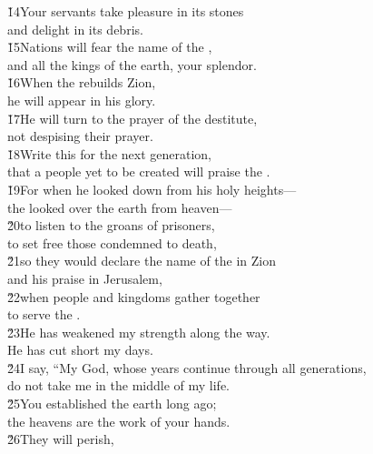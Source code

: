 \begin{poetry}
\poeml \v{14}Your servants take pleasure in its stones \\
\poemll    and delight in its debris. \\
\poeml \v{15}Nations will fear the name of the , \\
\poemll    and all the kings of the earth, your splendor. \\
\poeml \v{16}When the  rebuilds Zion, \\
\poemll    he will appear in his glory. \\
\poeml \v{17}He will turn to the prayer of the destitute, \\
\poemll    not despising their prayer. \\
\poeml \v{18}Write this for the next generation, \\
\poemll    that a people yet to be created will praise the . \\
\poeml \v{19}For when he looked down from his holy heights--- \\
\poemll    the  looked over the earth from heaven--- \\
\poeml \v{20}to listen to the groans of prisoners, \\
\poemll    to set free those condemned to death, \\
\poeml \v{21}so they would declare the name of the  in Zion \\
\poemll    and his praise in Jerusalem, \\
\poeml \v{22}when people and kingdoms gather together \\
\poemll    to serve the . \\
\poeml \v{23}He has weakened my strength along the way. \\
\poemll    He has cut short my days. \\
\poeml \v{24}I say, ``My God, whose years continue through all generations, \\
\poemll    do not take me in the middle of my life. \\
\poeml \v{25}You established the earth long ago; \\
\poemll    the heavens are the work of your hands. \\
\poeml \v{26}They will perish, \\

\end{poetry}
